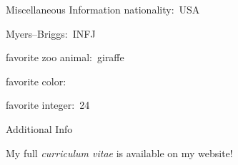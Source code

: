 \documentclass{resume}
\begin{document}
{\begin{rSection}{Miscellaneous Information}
  nationality:~USA



  Myers--Briggs:~INFJ

  favorite zoo animal:~giraffe

  favorite color:~

  favorite integer:~24

  \end{rSection}





}{

  \begin{rSection}{Additional Info}


    My full \emph{curriculum vitae} is available on my website!

  \end{rSection}

}
\end{document}
